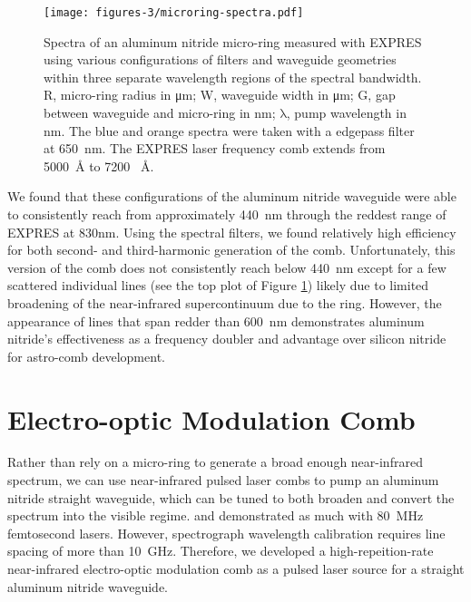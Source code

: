 \begin{figure}
    \centering
    \texttt{[image: figures-3/microring-spectra.pdf]}
    \caption{Spectra of an aluminum nitride micro-ring measured with EXPRES using various configurations of filters and waveguide geometries within three separate wavelength regions of the spectral bandwidth. R, micro-ring radius in \si{\micro\meter}; W, waveguide width in \si{\micro\meter}; G, gap between waveguide and micro-ring in \si{\nano\meter}; $\mathrm{\lambda}$, pump wavelength in \si{\nano\meter}. The blue and orange spectra were taken with a edgepass filter at 650~\si{\nano\meter}. The EXPRES laser frequency comb extends from 5000~\si{\angstrom} to 7200~
    \si{\angstrom}.}
    \label{fig:microring-spectra}
\end{figure}

We found that these configurations of the aluminum nitride waveguide were able to consistently reach from approximately 440~\si{\nano\meter} through the reddest range of EXPRES at 830\si{\nano\meter}. Using the spectral filters, we found relatively high efficiency for both second- and third-harmonic generation of the comb. Unfortunately, this version of the comb does not consistently reach below 440~\si{\nano\meter} except for a few scattered individual lines (see the top plot of Figure \ref{fig:microring-spectra}) likely due to limited broadening of the near-infrared supercontinuum due to the ring. However, the appearance of lines that span redder than 600~\si{\nano\meter} demonstrates aluminum nitride's effectiveness as a frequency doubler and advantage over silicon nitride for astro-comb development.

\section{Electro-optic Modulation Comb} \label{astro-comb:eom}

Rather than rely on a micro-ring to generate a broad enough near-infrared spectrum, we can use near-infrared pulsed laser combs to pump an aluminum nitride straight waveguide, which can be tuned to both broaden and convert the spectrum into the visible regime. \citet{liu_beyond_2019} and \citet{lu_ultraviolet_2020} demonstrated as much with 80~\si{\mega\hertz} femtosecond lasers. However, spectrograph wavelength calibration requires line spacing of more than 10~\si{\giga\hertz}. Therefore, we developed a high-repeition-rate near-infrared electro-optic modulation comb as a pulsed laser source for a straight aluminum nitride waveguide.

